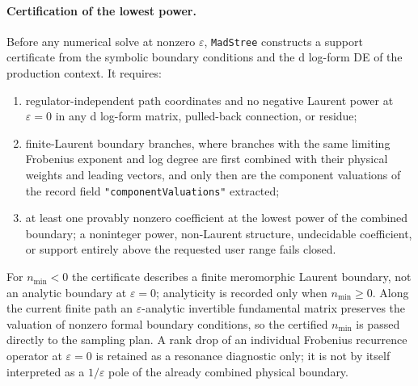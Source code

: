 \documentclass[11pt,a4paper]{article}
\begin{document}
\paragraph{Certification of the lowest power.}
Before any numerical solve at nonzero $\varepsilon$, \texttt{MadStree} constructs a support
certificate from the symbolic boundary conditions and the d log-form DE of the production
context. It requires:
\begin{enumerate}
  \item regulator-independent path coordinates and no negative Laurent power at
        $\varepsilon=0$ in any d log-form matrix, pulled-back connection, or residue;
  \item finite-Laurent boundary branches, where branches with the same limiting Frobenius
        exponent and log degree are first combined with their physical weights and leading
        vectors, and only then are the component valuations of the record field
        \texttt{"componentValuations"} extracted;
  \item at least one provably nonzero coefficient at the lowest power of the combined
        boundary; a noninteger power, non-Laurent structure, undecidable coefficient, or
        support entirely above the requested user range fails closed.
\end{enumerate}
For $n_{\min}<0$ the certificate describes a finite meromorphic Laurent boundary, not an
analytic boundary at $\varepsilon=0$; analyticity is recorded only when $n_{\min}\geq0$.
Along the current finite path an $\varepsilon$-analytic invertible fundamental matrix
preserves the valuation of nonzero formal boundary conditions, so the certified $n_{\min}$ is
passed directly to the sampling plan. A rank drop of an individual Frobenius recurrence
operator at $\varepsilon=0$ is retained as a resonance diagnostic only; it is not by itself
interpreted as a $1/\varepsilon$ pole of the already combined physical boundary.
\end{document}
